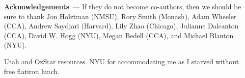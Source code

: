 \documentclass[modern]{aastex631}
\renewcommand{\paragraph}[1]{\medskip\par\noindent\textbf{#1}~---}
\newcommand{\todo}[1]{\textcolor{tab:red}{#1}}
\begin{document}

\paragraph{Acknowledgements}
If they do not become co-authors, then we should be sure to thank
    Jon Holztman (NMSU),
    Rory Smith (Monash),
    Adam Wheeler (CCA),
    Andrew Saydjari (Harvard),
    Lily Zhao (Chicago),
    Julianne Dalcanton (CCA),
    David W. Hogg (NYU),
    Megan Bedell (CCA), and
    Michael Blanton (NYU).

\todo{Utah and OzStar resources. NYU for accommodating me as I starved without free flatiron lunch.}

%
\end{document}
